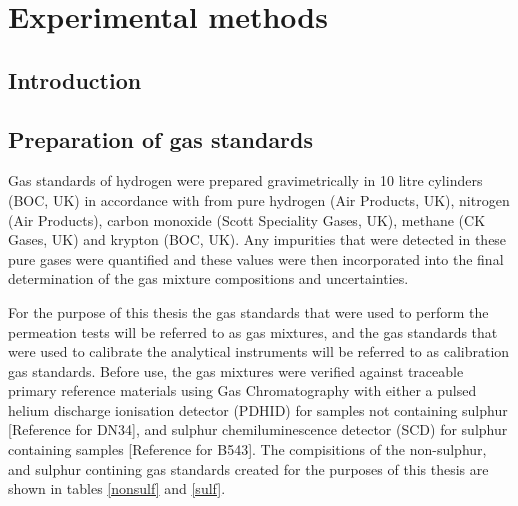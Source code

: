 \chapter{Experimental methods}
\section{Introduction}

\section{Preparation of gas standards} \label{gasprep}
Gas standards of hydrogen were prepared gravimetrically in 10 litre cylinders (BOC, UK) in accordance with \cite{InternationalStandardISO6142-1:2015} from pure hydrogen (Air Products, UK), nitrogen (Air Products), carbon monoxide (Scott Speciality Gases, UK), methane (CK Gases, UK) and krypton (BOC, UK). Any impurities that were detected in these pure gases were quantified and these values were then incorporated into the final determination of the gas mixture compositions and uncertainties. 

For the purpose of this thesis the gas standards that were used to perform the permeation tests will be referred to as gas mixtures, and the gas standards that were used to calibrate the analytical instruments will be referred to as calibration gas standards. Before use, the gas mixtures were verified against traceable primary reference materials using Gas Chromatography with either a pulsed helium discharge ionisation detector (PDHID) for samples not containing sulphur [Reference for DN34], and sulphur chemiluminescence detector (SCD) for sulphur containing samples [Reference for B543]. The compisitions of the non-sulphur, and sulphur contining gas standards created for the purposes of this thesis are shown in tables \ref{nonsulf} and \ref{sulf}.

